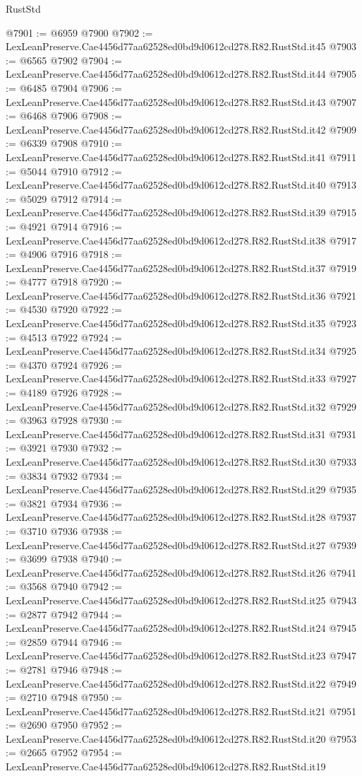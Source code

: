 \begin{lexlean}{RustStd}
\begin{coremodule}
@7901 := @6959 @7900
@7902 := LexLeanPreserve.Cae4456d77aa62528ed0bd9d0612cd278.R82.RustStd.it45
@7903 := @6565 @7902
@7904 := LexLeanPreserve.Cae4456d77aa62528ed0bd9d0612cd278.R82.RustStd.it44
@7905 := @6485 @7904
@7906 := LexLeanPreserve.Cae4456d77aa62528ed0bd9d0612cd278.R82.RustStd.it43
@7907 := @6468 @7906
@7908 := LexLeanPreserve.Cae4456d77aa62528ed0bd9d0612cd278.R82.RustStd.it42
@7909 := @6339 @7908
@7910 := LexLeanPreserve.Cae4456d77aa62528ed0bd9d0612cd278.R82.RustStd.it41
@7911 := @5044 @7910
@7912 := LexLeanPreserve.Cae4456d77aa62528ed0bd9d0612cd278.R82.RustStd.it40
@7913 := @5029 @7912
@7914 := LexLeanPreserve.Cae4456d77aa62528ed0bd9d0612cd278.R82.RustStd.it39
@7915 := @4921 @7914
@7916 := LexLeanPreserve.Cae4456d77aa62528ed0bd9d0612cd278.R82.RustStd.it38
@7917 := @4906 @7916
@7918 := LexLeanPreserve.Cae4456d77aa62528ed0bd9d0612cd278.R82.RustStd.it37
@7919 := @4777 @7918
@7920 := LexLeanPreserve.Cae4456d77aa62528ed0bd9d0612cd278.R82.RustStd.it36
@7921 := @4530 @7920
@7922 := LexLeanPreserve.Cae4456d77aa62528ed0bd9d0612cd278.R82.RustStd.it35
@7923 := @4513 @7922
@7924 := LexLeanPreserve.Cae4456d77aa62528ed0bd9d0612cd278.R82.RustStd.it34
@7925 := @4370 @7924
@7926 := LexLeanPreserve.Cae4456d77aa62528ed0bd9d0612cd278.R82.RustStd.it33
@7927 := @4189 @7926
@7928 := LexLeanPreserve.Cae4456d77aa62528ed0bd9d0612cd278.R82.RustStd.it32
@7929 := @3963 @7928
@7930 := LexLeanPreserve.Cae4456d77aa62528ed0bd9d0612cd278.R82.RustStd.it31
@7931 := @3921 @7930
@7932 := LexLeanPreserve.Cae4456d77aa62528ed0bd9d0612cd278.R82.RustStd.it30
@7933 := @3834 @7932
@7934 := LexLeanPreserve.Cae4456d77aa62528ed0bd9d0612cd278.R82.RustStd.it29
@7935 := @3821 @7934
@7936 := LexLeanPreserve.Cae4456d77aa62528ed0bd9d0612cd278.R82.RustStd.it28
@7937 := @3710 @7936
@7938 := LexLeanPreserve.Cae4456d77aa62528ed0bd9d0612cd278.R82.RustStd.it27
@7939 := @3699 @7938
@7940 := LexLeanPreserve.Cae4456d77aa62528ed0bd9d0612cd278.R82.RustStd.it26
@7941 := @3568 @7940
@7942 := LexLeanPreserve.Cae4456d77aa62528ed0bd9d0612cd278.R82.RustStd.it25
@7943 := @2877 @7942
@7944 := LexLeanPreserve.Cae4456d77aa62528ed0bd9d0612cd278.R82.RustStd.it24
@7945 := @2859 @7944
@7946 := LexLeanPreserve.Cae4456d77aa62528ed0bd9d0612cd278.R82.RustStd.it23
@7947 := @2781 @7946
@7948 := LexLeanPreserve.Cae4456d77aa62528ed0bd9d0612cd278.R82.RustStd.it22
@7949 := @2710 @7948
@7950 := LexLeanPreserve.Cae4456d77aa62528ed0bd9d0612cd278.R82.RustStd.it21
@7951 := @2690 @7950
@7952 := LexLeanPreserve.Cae4456d77aa62528ed0bd9d0612cd278.R82.RustStd.it20
@7953 := @2665 @7952
@7954 := LexLeanPreserve.Cae4456d77aa62528ed0bd9d0612cd278.R82.RustStd.it19

\end{coremodule}
\end{lexlean}
